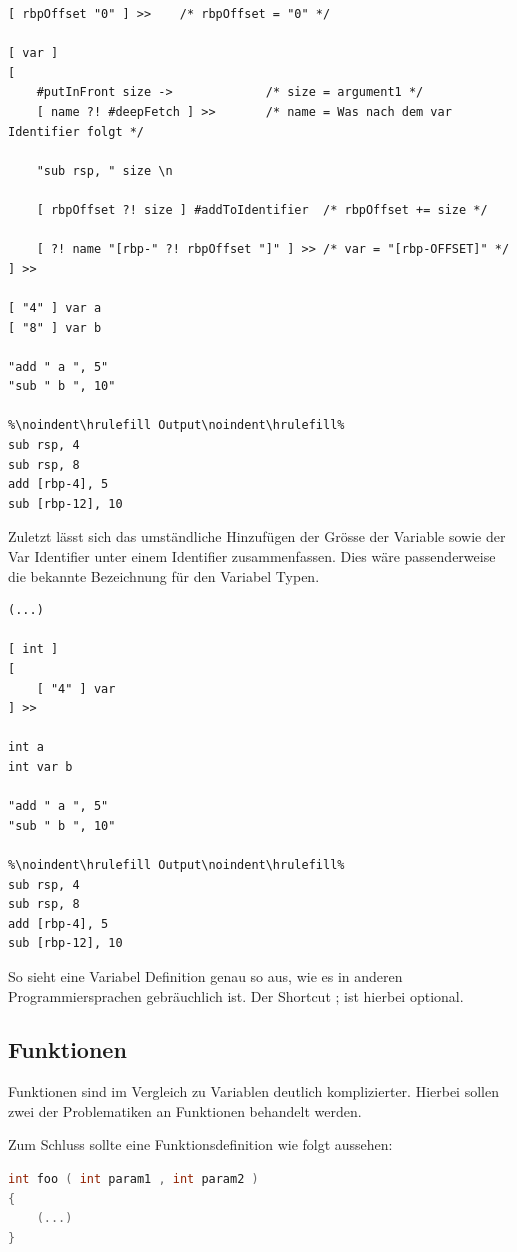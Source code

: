 \begin{lstlisting}[language=QHS, caption=Definition einer Variable mit rbpOffset]
[ rbpOffset "0" ] >>    /* rbpOffset = "0" */

[ var ]
[
    #putInFront size ->             /* size = argument1 */
    [ name ?! #deepFetch ] >>       /* name = Was nach dem var Identifier folgt */

    "sub rsp, " size \n

    [ rbpOffset ?! size ] #addToIdentifier  /* rbpOffset += size */

    [ ?! name "[rbp-" ?! rbpOffset "]" ] >> /* var = "[rbp-OFFSET]" */
] >> 

[ "4" ] var a 
[ "8" ] var b 

"add " a ", 5"
"sub " b ", 10"
    
%\noindent\hrulefill Output\noindent\hrulefill%
sub rsp, 4
sub rsp, 8
add [rbp-4], 5
sub [rbp-12], 10
\end{lstlisting}

Zuletzt lässt sich das umständliche Hinzufügen der Grösse der Variable sowie der Var Identifier unter einem Identifier zusammenfassen. Dies wäre passenderweise die bekannte Bezeichnung für den Variabel Typen.

\begin{lstlisting}[language=QHS, caption=Definition einer Variable mit int Identifier]
(...)

[ int ] 
[
    [ "4" ] var
] >>
    
int a 
int var b 
    
"add " a ", 5"
"sub " b ", 10"
        
%\noindent\hrulefill Output\noindent\hrulefill%
sub rsp, 4
sub rsp, 8
add [rbp-4], 5
sub [rbp-12], 10
\end{lstlisting}

So sieht eine Variabel Definition genau so aus, wie es in anderen Programmiersprachen gebräuchlich ist. Der Shortcut ; ist hierbei optional.

\subsection{Funktionen} \label{sec:qhs-funcs}
Funktionen sind im Vergleich zu Variablen deutlich komplizierter. Hierbei sollen zwei der Problematiken an Funktionen behandelt werden.

Zum Schluss sollte eine Funktionsdefinition wie folgt aussehen:


\begin{lstlisting}[language=C, label=eg:qhs-function_goal, caption=Ziel für die Definition einer Funktion in QHS]
int foo ( int param1 , int param2 )
{
    (...)
}
\end{lstlisting}

